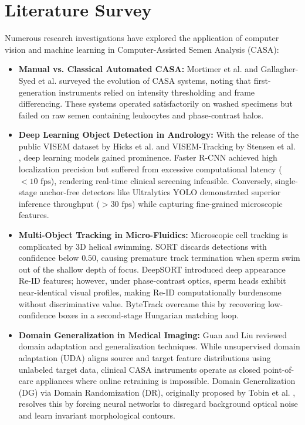 \documentclass[12pt,a4paper]{report}
\begin{document}
\section{Literature Survey}
Numerous research investigations have explored the application of computer vision and machine learning in Computer-Assisted Semen Analysis (CASA):
\begin{itemize}
    \item \textbf{Manual vs. Classical Automated CASA:} Mortimer et al. \cite{mortimer2012} and Gallagher-Syed et al. \cite{gallagher2022} surveyed the evolution of CASA systems, noting that first-generation instruments relied on intensity thresholding and frame differencing. These systems operated satisfactorily on washed specimens but failed on raw semen containing leukocytes and phase-contrast halos.
    \item \textbf{Deep Learning Object Detection in Andrology:} With the release of the public VISEM dataset by Hicks et al. \cite{visem2019} and VISEM-Tracking by Stensen et al. \cite{visemtrack2023}, deep learning models gained prominence. Faster R-CNN \cite{ren2017} achieved high localization precision but suffered from excessive computational latency ($<10\text{ fps}$), rendering real-time clinical screening infeasible. Conversely, single-stage anchor-free detectors like Ultralytics YOLO \cite{yolov8} demonstrated superior inference throughput ($>30\text{ fps}$) while capturing fine-grained microscopic features.
    \item \textbf{Multi-Object Tracking in Micro-Fluidics:} Microscopic cell tracking is complicated by 3D helical swimming. SORT \cite{sort2016} discards detections with confidence below $0.50$, causing premature track termination when sperm swim out of the shallow depth of focus. DeepSORT \cite{deepsort2017} introduced deep appearance Re-ID features; however, under phase-contrast optics, sperm heads exhibit near-identical visual profiles, making Re-ID computationally burdensome without discriminative value. ByteTrack \cite{bytetrack2022} overcame this by recovering low-confidence boxes in a second-stage Hungarian matching loop.
    \item \textbf{Domain Generalization in Medical Imaging:} Guan and Liu \cite{guan2022} reviewed domain adaptation and generalization techniques. While unsupervised domain adaptation (UDA) aligns source and target feature distributions using unlabeled target data, clinical CASA instruments operate as closed point-of-care appliances where online retraining is impossible. Domain Generalization (DG) via Domain Randomization (DR), originally proposed by Tobin et al. \cite{tobin2017}, resolves this by forcing neural networks to disregard background optical noise and learn invariant morphological contours.
\end{itemize}
\end{document}
